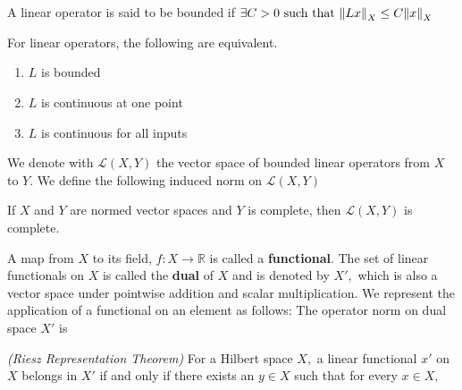 A linear operator is said to be bounded if $\exists C>0\text{ such that } \norm{Lx}_X\leq C\norm{x}_X$
\begin{theorem}
    For linear operators, the following are equivalent.
    \begin{enumerate}
        \item $L$ is bounded
        \item $L$ is continuous at one point
        \item $L$ is continuous for all inputs
    \end{enumerate}
\end{theorem}
We denote with $\mathcal{L}(X,Y)$ the vector space of  bounded linear operators from $X$ to $Y$. We define the following induced norm on $\mathcal{L}(X,Y)$
\begin{theorem}
    If $X$ and $Y$ are normed vector spaces and $Y$ is complete, then $\mathcal{L}(X,Y)$ is complete.
\end{theorem}
A map from $X$ to its field, $f:X\rightarrow \mathbb{R}$ is called a \textbf{functional}. The set of linear functionals on $X$ is called the \textbf{dual} of $X$ and is denoted by $X',$ which is also a vector space under pointwise addition and scalar multiplication. We represent the application of a functional on an element as follows:
The operator norm on dual space $X'$ is
\begin{theorem}
    \textit{(Riesz Representation Theorem)} For a Hilbert space $X,$ a linear functional $x'$ on $X$ belongs in $X'$ if and only if there exists an $y\in X$ such that for every $x\in X,$
\end{theorem}


